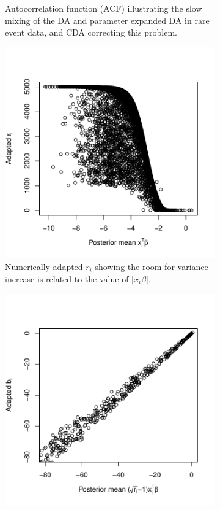 \documentclass[10pt]{article}
\newcommand{\xbeta}{ x_i \beta}
\begin{document}
\begin{figure}[H]
\begin{subfigure}[b]{0.49\textwidth}
  \caption{Autocorrelation function (ACF) illustrating the slow mixing of the DA and parameter expanded DA in rare event data, and CDA correcting this problem.}
    \label{probit_reg_acf}
\end{subfigure}
   \begin{subfigure}[b]{0.49\textwidth}
 \includegraphics[width=1\textwidth]{probit_cda_r}
  \caption{Numerically adapted $r_i$ showing the room for variance increase is related to the  value of $|\xbeta|$.}
    \label{probit_reg_r}
\end{subfigure}
  \begin{subfigure}[b]{0.49\textwidth}
 \includegraphics[width=1\textwidth]{probit_cda_b}

\end{subfigure}
\end{figure}
\end{document}
